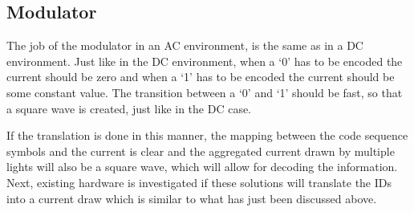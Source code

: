 

\subsection{Modulator}	
\label{subsec:ac-modulator}

The job of the modulator in an AC environment, is the same as in a DC environment.
Just like in the DC environment, when a `0' has to be encoded the current should be zero and when a `1' has to be encoded the current should be some constant value.
The transition between a `0' and `1' should be fast, so that a square wave is created, just like in the DC case.

If the translation is done in this manner, the mapping between the code sequence symbols and the current is clear and the aggregated current drawn by multiple lights will also be a square wave, which will allow for decoding the information.
Next, existing hardware is investigated if these solutions will translate the IDs into a current draw which is similar to what has just been discussed above. 








